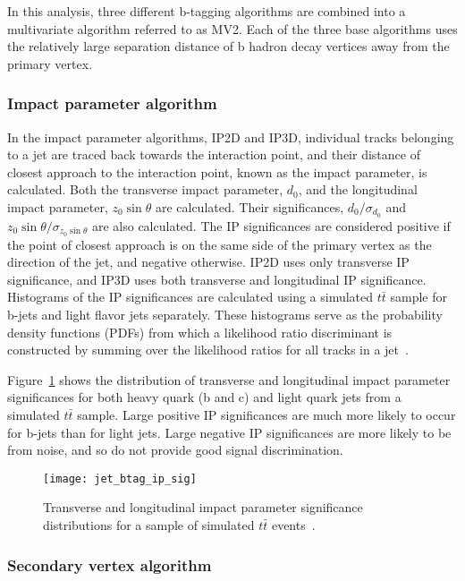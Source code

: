 In this analysis, three different b-tagging algorithms are combined into a multivariate algorithm referred to as MV2.
Each of the three base algorithms uses the relatively large separation distance of b hadron decay vertices away from the primary vertex.

\subsubsection{Impact parameter algorithm}\label{subsubsec:jet_btag_ip}

In the impact parameter algorithms, IP2D and IP3D, individual tracks belonging to a jet are traced back towards the interaction point, and their distance of closest approach to the interaction point, known as the impact parameter, is calculated.
Both the transverse impact parameter, $d_0$, and the longitudinal impact parameter, $z_0 \sin\theta$ are calculated.
Their significances, $d_0/ \sigma_{d_0}$ and $z_0 \sin\theta / \sigma_{z_0 \sin\theta}$ are also calculated.
The IP significances are considered positive if the point of closest approach is on the same side of the primary vertex as the direction of the jet, and negative otherwise.
IP2D uses only transverse IP significance, and IP3D uses both transverse and longitudinal IP significance.
Histograms of the IP significances are calculated using a simulated $t\bar{t}$ sample for b-jets and light flavor jets separately.
These histograms serve as the probability density functions (PDFs) from which a likelihood ratio discriminant is constructed by summing over the likelihood ratios for all tracks in a jet~\cite{jet-bjet-opt}.

Figure~\ref{fig:jet_btag_ip_sig} shows the distribution of transverse and longitudinal impact parameter significances for both heavy quark (b and c) and light quark jets from a simulated $t\bar{t}$ sample.
Large positive IP significances are much more likely to occur for b-jets than for light jets.
Large negative IP significances are more likely to be from noise, and so do not provide good signal discrimination.

\begin{figure}[!ht]
    \centering
\texttt{[image: jet\_btag\_ip\_sig]}
\caption{Transverse and longitudinal impact parameter significance distributions for a sample of simulated $t\bar{t}$
events~\cite{jet-bjet-opt}.}
\label{fig:jet_btag_ip_sig}
\end{figure}

\subsubsection{Secondary vertex algorithm}\label{subsubsec:jet_btag_svx}

